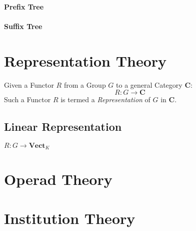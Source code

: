 \paragraph{Prefix Tree}\label{sec:prefix_tree}

\paragraph{Suffix Tree}\label{sec:suffix_tree}



\section{Representation Theory}\label{sec:representation_theory}

Given a Functor $R$ from a Group $G$ to a general Category
$\mathbf{C}$:
\[
    R : G \rightarrow \mathbf{C}
\]
Such a Functor $R$ is termed a \emph{Representation} of $G$ in
$\mathbf{C}$.



\subsection{Linear Representation}\label{sec:linear_representation}

$R : G \rightarrow \mathbf{Vect}_K$



\section{Operad Theory}\label{sec:operad_theory}

\section{Institution Theory}\label{sec:institution_theory}


